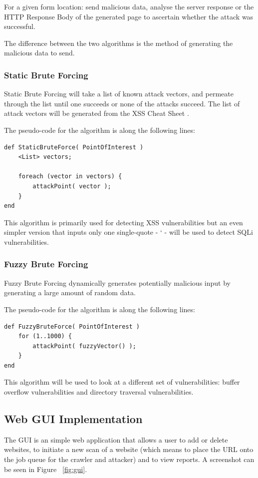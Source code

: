 \documentclass[12pt,a4paper]{article}
\begin{document}
For a given form location: send malicious data, analyse the server response or the HTTP Response Body of the generated page to ascertain whether the attack was successful.

The difference between the two algorithms is the method of generating the malicious data to send.

\subsubsection{Static Brute Forcing}
Static Brute Forcing will take a list of known attack vectors, and permeate through the list until one succeeds or none of the attacks succeed.  The list of attack vectors will be generated from the XSS Cheat Sheet \cite{Hansen:2009:Online}.

The pseudo-code for the algorithm is along the following lines:

\begin{lstlisting}
def StaticBruteForce( PointOfInterest )     
    <List> vectors;
    
    foreach (vector in vectors) { 
        attackPoint( vector );
    }
end
\end{lstlisting}

This algorithm is primarily used for detecting XSS vulnerabilities but an even simpler version that inputs only one single-quote - ‘ - will be used to detect SQLi vulnerabilities.

\subsubsection{Fuzzy Brute Forcing}
Fuzzy Brute Forcing dynamically generates potentially malicious input by generating a large amount of random data. \cite{Sutton2007}

The pseudo-code for the algorithm is along the following lines:

\begin{lstlisting} 
def FuzzyBruteForce( PointOfInterest )
	for (1..1000) { 		
	    attackPoint( fuzzyVector() ); 	
	}
end
\end{lstlisting}
This algorithm will be used to look at a different set of vulnerabilities: buffer overflow vulnerabilities and directory traversal vulnerabilities.

\subsection{Web GUI Implementation}
The GUI is an simple web application that allows a user to add or delete websites, to initiate a new scan of a website (which means to place the URL onto the job queue for the crawler and attacker) and to view reports.  A screenshot can be seen in Figure ~\ref{fig:gui}.
\end{document}

